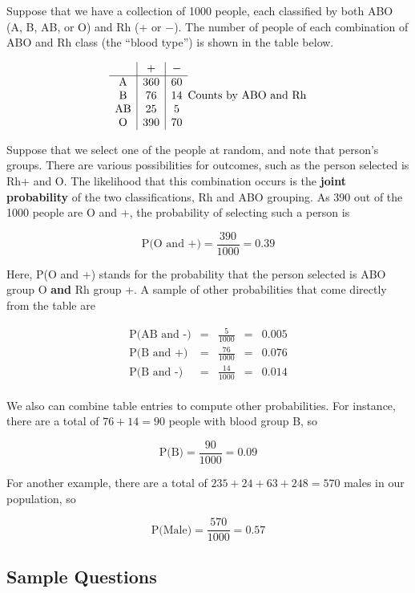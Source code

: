 \documentclass[
]{book}
\begin{document}
Suppose that we have a collection of 1000 people, each classified by both
ABO (A, B, AB, or O) and Rh (+ or \(-\)).
The number of people of each combination of ABO and Rh class (the ``blood type'') is shown
in the table below.

\[
\begin{array}{c|c|c}
       & \mathrm{+} & - \\ \hline
\mathrm{A} & 360 & 60 \\ 
\mathrm{B} & 76 & 14 \\ 
\mathrm{AB} & 25 & 5 \\ 
\mathrm{O} & 390 & 70 \\ 
\end{array}\\
\mbox{Counts by ABO and Rh}
\]

Suppose that we select one of the people at random, and note that person's groups.
There are various possibilities for outcomes, such as the person selected is Rh+ and O.
The likelihood that this combination occurs is the \textbf{joint probability} of the two classifications,
Rh and ABO grouping.
As 390 out of the 1000 people are O and +, the probability of selecting such a person is

\[\mbox{P(O and +)} = \frac{390}{1000} = 0.39\]

Here, P(O and +) stands for the probability that the person selected is
ABO group O \textbf{and} Rh group +.
A sample of other probabilities that come directly from the table are

\[\begin{array}{rcccl}
\mbox{P(AB and -)} & = & {\displaystyle\frac{5}{1000}} & = & 0.005 \\[5pt]
\mbox{P(B and +)} & = & {\displaystyle\frac{76}{1000}} & = & 0.076 \\[5pt]
\mbox{P(B and -)} & = & {\displaystyle\frac{14}{1000}} & = & 0.014 \\
\end{array}\]

We also can combine table entries to compute other probabilities.
For instance, there are a total of \(76 + 14 = 90\) people with blood group B, so

\[
\mbox{P(B)} = \frac{90}{1000} = 0.09
\]

For another example, there are a total of \(235 + 24 + 63 + 248 = 570\) males in our population, so

\[
\mbox{P(Male)} = \frac{570}{1000} = 0.57
\]

\hypertarget{sample-questions-2}{%
\subsection{Sample Questions}\label{sample-questions-2}}
\end{document}
